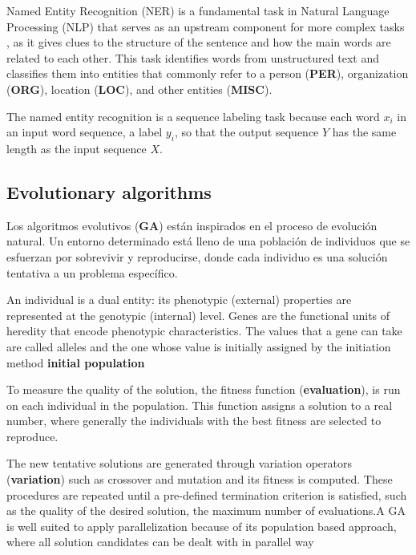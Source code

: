 \documentclass{IEEEtran}
\begin{document}
Named Entity Recognition (NER) is a fundamental task in Natural Language Processing (NLP) that serves as an upstream component for more complex tasks \cite{ma-etal-2022-label}, as it gives clues to the structure of the sentence and how the main words are related to each other. This task identifies words from unstructured text and classifies them into entities that commonly refer to a person (\textbf{PER}), organization (\textbf{ORG}), location (\textbf{LOC}), and other entities (\textbf{MISC}).

The named entity recognition is a sequence labeling task\cite{martin-2020-speech} because each word $x_i$ in an input word sequence, a label $y_i$, so that the output sequence $Y$ has the same length as the input sequence $X$.


\subsection{Evolutionary algorithms}

Los algoritmos evolutivos (\textbf{GA}) están inspirados en el proceso de evolución natural. Un entorno determinado está lleno de una población de individuos que se esfuerzan por sobrevivir y reproducirse\cite{eiben-2015-speech}, donde cada individuo es una solución tentativa a un problema específico.

An individual is a dual entity: its phenotypic (external) properties are represented at the genotypic (internal) level. Genes are the functional units of heredity that encode phenotypic characteristics\cite{eiben-2015-speech}. The values that a gene can take are called alleles and the one whose value is initially assigned by the initiation method \textbf{initial population}

To measure the quality of the solution, the fitness function (\textbf{evaluation}), is run on each individual in the population\cite{eiben-2015-speech}. This function assigns a solution to a real number, where generally the individuals with the best fitness are selected to reproduce.

The new tentative solutions are generated through variation operators (\textbf{variation}) such as crossover and mutation and its fitness is computed. These procedures are repeated until a pre-defined termination criterion is satisfied, such as the quality of the desired solution, the maximum number of evaluations.A GA is well suited to apply parallelization because of its population based approach, where all solution candidates can be dealt with in parallel way\cite{Linder2020-Parallel}
\end{document}
